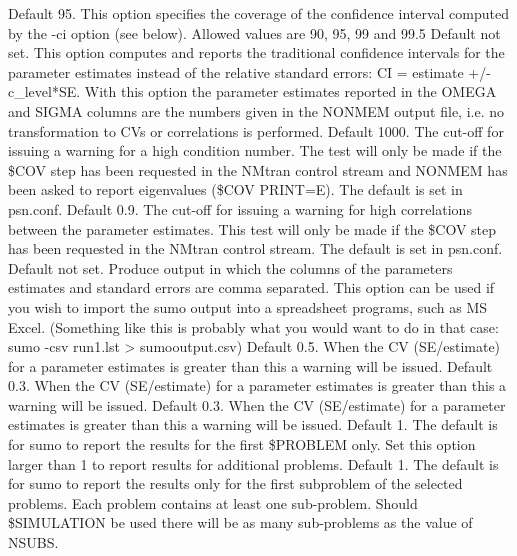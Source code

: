 \begin{optionlist}
Default 95. This option specifies the coverage of the confidence interval computed by the -ci option (see below). Allowed values are 90, 95, 99 and 99.5 
\nextopt
{}
Default not set. This option computes and reports the traditional confidence intervals for the parameter estimates instead of the relative standard errors: CI = estimate +/- c\_level*SE. With this option the parameter estimates reported in the OMEGA and SIGMA columns are the numbers given in the NONMEM output file, i.e. no transformation to CVs or correlations is performed. 
\nextopt
{}
Default 1000. The cut-off for issuing a warning for a high condition number. The test will only be made if the \$COV step has been requested in the NMtran control stream and NONMEM has been asked to report eigenvalues (\$COV PRINT=E). The default is set in psn.conf. 
\nextopt
{}
Default 0.9. The cut-off for issuing a warning for high correlations between the parameter estimates. This test will only be made if the \$COV step has been requested in the NMtran control stream. The default is set in psn.conf. 
\nextopt
{}
Default not set. Produce output in which the columns of the parameters estimates and standard errors are comma separated. This option can be used if you wish to import the sumo output into a spreadsheet programs, such as MS Excel. (Something like this is probably what you would want to do in that case: sumo -csv run1.lst > sumooutput.csv) 
\nextopt
{}
Default 0.5. When the CV (SE/estimate) for a parameter estimates is greater than this a warning will be issued. 
\nextopt
{}
Default 0.3. When the CV (SE/estimate) for a parameter estimates is greater than this a warning will be issued. 
\nextopt
{}
Default 0.3. When the CV (SE/estimate) for a parameter estimates is greater than this a warning will be issued. 
\nextopt
{}
Default 1. The default is for sumo to report the results for the first \$PROBLEM only. Set this option larger than 1 to report results for additional problems. 
\nextopt
{}
Default 1. The default is for sumo to report the results only for the first subproblem of the selected problems. Each problem contains at least one sub-problem. Should \$SIMULATION be used there will be as many sub-problems as the value of NSUBS. 

\end{optionlist}
